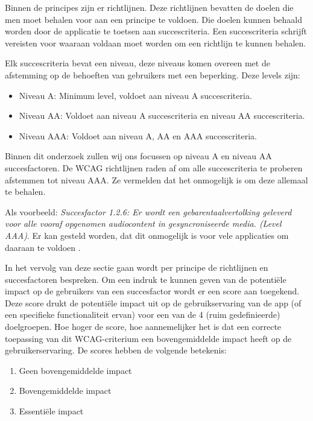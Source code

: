 Binnen de principes zijn er richtlijnen. Deze richtlijnen bevatten de doelen die men moet behalen voor aan een principe te voldoen. Die doelen kunnen behaald worden door de applicatie te toetsen aan succescriteria. Een succescriteria schrijft vereisten voor waaraan voldaan moet worden om een richtlijn te kunnen behalen. 

Elk succescriteria bevat een niveau, deze niveaus komen overeen met de afstemming op de behoeften van gebruikers met een beperking. Deze levels zijn:
\begin{itemize}
    \item Niveau A: Minimum level, voldoet aan niveau A succescriteria.
    \item Niveau AA: Voldoet aan niveau A succescriteria en niveau AA succescriteria.
    \item Niveau AAA: Voldoet aan niveau A, AA en AAA succescriteria.
\end{itemize}

Binnen dit onderzoek zullen wij ons focussen op niveau A en niveau AA succesfactoren. De WCAG richtlijnen raden af om alle succescriteria te proberen afstemmen tot niveau AAA. Ze vermelden dat het onmogelijk is om deze allemaal te behalen. 

Als voorbeeld:  \emph{Succesfactor 1.2.6: Er wordt een gebarentaalvertolking geleverd voor alle vooraf opgenomen audiocontent in gesyncroniseerde media. (Level AAA)}. Er kan gesteld worden, dat dit onmogelijk is voor vele applicaties om daaraan te voldoen \autocite{WCAG2.1Criteria}.

In het vervolg van deze sectie gaan wordt per principe de richtlijnen en succesfactoren bespreken. Om een indruk te kunnen geven van de potentiële impact op de gebruikers van een succesfactor wordt er een score aan toegekend. Deze score drukt de potentiële impact uit op de gebruikservaring van de app (of een specifieke functionaliteit ervan) voor een van de 4 (ruim gedefinieerde) doelgroepen.
Hoe hoger de score, hoe aannemelijker het is dat een correcte toepassing van dit WCAG-criterium een bovengemiddelde impact heeft op de gebruikerservaring. De scores hebben de volgende betekenis:
\begin{enumerate}
    \item Geen bovengemiddelde impact
    \item Bovengemiddelde impact
    \item Essentiële impact
\end{enumerate}


\newpage
